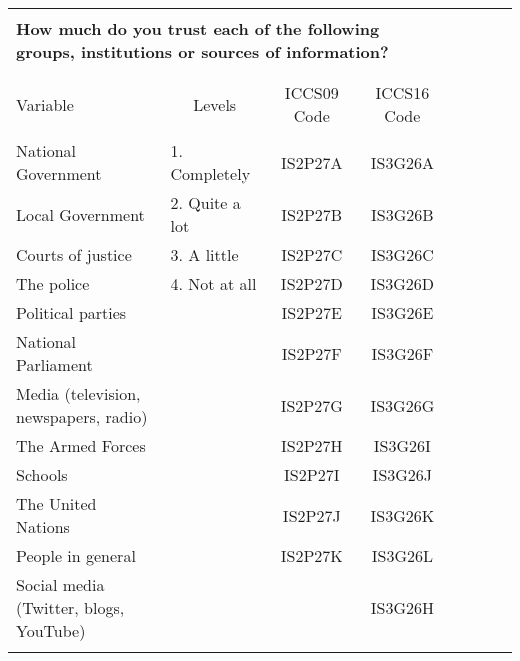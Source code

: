 \documentclass{article}
\begin{document}
\begin{table}[h] 
\centering 
  \label{table:1} 
\begin{tabular}{@{\extracolsep{3pt}}lccccccc} 
\\[-5ex]
\hline \\[-3ex] 
\multicolumn{4}{l}{\textbf{How much do you trust each of the following groups, institutions or sources of information?}} \\ 
\\[-3ex]
\hline \\[-3ex] 
Variable & Levels & \multicolumn{1}{c}{ICCS09 Code} & \multicolumn{1}{c}{ICCS16 Code} \\ 
\hline \\[-3ex] 
National Government & \multicolumn{1}{l}{1. Completely} & IS2P27A & IS3G26A \\ 
Local Government  & \multicolumn{1}{l}{2. Quite a lot} & IS2P27B & IS3G26B \\ 
Courts of justice & \multicolumn{1}{l}{3. A little} & IS2P27C & IS3G26C \\ 
The police & \multicolumn{1}{l}{4. Not at all} & IS2P27D & IS3G26D \\ 
Political parties &  & IS2P27E & IS3G26E \\ 
National Parliament & & IS2P27F & IS3G26F  \\ 
Media (television, newspapers, radio) & & IS2P27G & IS3G26G  \\ 
The Armed Forces & & IS2P27H & IS3G26I \\ 
Schools & & IS2P27I & IS3G26J  \\ 
The United Nations &  & IS2P27J & IS3G26K  \\ 
People in general & & IS2P27K & IS3G26L \\ 
Social media (Twitter, blogs, YouTube) & &  & IS3G26H \\ 
\hline \\[-1.8ex] 
\end{tabular} 
\end{table} 

\break
\end{document}
